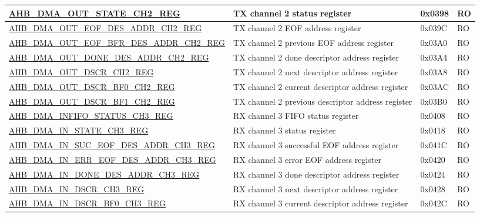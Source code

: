 \begin{longtable}{ | l | p{10cm} | p{1.3cm} | l | }
\hyperref[regdesc:AHBDMAOUTSTATECHNREG]{AHB\_DMA\_OUT\_STATE\_CH2\_REG} & TX channel 2 status register & 0x0398 & RO \\ \hline
\hyperref[regdesc:AHBDMAOUTEOFDESADDRCHNREG]{AHB\_DMA\_OUT\_EOF\_DES\_ADDR\_CH2\_REG} & TX channel 2 EOF address register & 0x039C & RO \\ \hline
\hyperref[regdesc:AHBDMAOUTEOFBFRDESADDRCHNREG]{AHB\_DMA\_OUT\_EOF\_BFR\_DES\_ADDR\_CH2\_REG} & TX channel 2 previous EOF address register & 0x03A0 & RO \\ \hline
\hyperref[regdesc:AHBDMAOUTDONEDESADDRCHNREG]{AHB\_DMA\_OUT\_DONE\_DES\_ADDR\_CH2\_REG} & TX channel 2 done descriptor address register & 0x03A4 & RO \\ \hline
\hyperref[regdesc:AHBDMAOUTDSCRCHNREG]{AHB\_DMA\_OUT\_DSCR\_CH2\_REG} & TX channel 2 next descriptor address register & 0x03A8 & RO \\ \hline
\hyperref[regdesc:AHBDMAOUTDSCRBF0CHNREG]{AHB\_DMA\_OUT\_DSCR\_BF0\_CH2\_REG} & TX channel 2 current descriptor address register & 0x03AC & RO \\ \hline
\hyperref[regdesc:AHBDMAOUTDSCRBF1CHNREG]{AHB\_DMA\_OUT\_DSCR\_BF1\_CH2\_REG} & TX channel 2 previous descriptor address register & 0x03B0 & RO \\ \hline
\hyperref[regdesc:AHBDMAINFIFOSTATUSCHNREG]{AHB\_DMA\_INFIFO\_STATUS\_CH3\_REG} & RX channel 3 FIFO status register & 0x0408 & RO \\ \hline
\hyperref[regdesc:AHBDMAINSTATECHNREG]{AHB\_DMA\_IN\_STATE\_CH3\_REG} & RX channel 3 status register & 0x0418 & RO \\ \hline
\hyperref[regdesc:AHBDMAINSUCEOFDESADDRCHNREG]{AHB\_DMA\_IN\_SUC\_EOF\_DES\_ADDR\_CH3\_REG} & RX channel 3 successful EOF address register & 0x041C & RO \\ \hline
\hyperref[regdesc:AHBDMAINERREOFDESADDRCHNREG]{AHB\_DMA\_IN\_ERR\_EOF\_DES\_ADDR\_CH3\_REG} & RX channel 3 error EOF address register & 0x0420 & RO \\ \hline
\hyperref[regdesc:AHBDMAINDONEDESADDRCHNREG]{AHB\_DMA\_IN\_DONE\_DES\_ADDR\_CH3\_REG} & RX channel 3 done descriptor address register & 0x0424 & RO \\ \hline
\hyperref[regdesc:AHBDMAINDSCRCHNREG]{AHB\_DMA\_IN\_DSCR\_CH3\_REG} & RX channel 3 next descriptor address register & 0x0428 & RO \\ \hline
\hyperref[regdesc:AHBDMAINDSCRBF0CHNREG]{AHB\_DMA\_IN\_DSCR\_BF0\_CH3\_REG} & RX channel 3 current descriptor address register & 0x042C & RO \\ \hline

\end{longtable}
